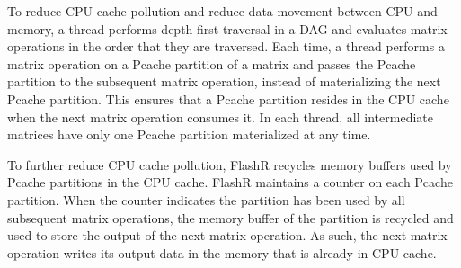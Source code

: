 To reduce CPU cache pollution and reduce data movement between CPU and memory,
a thread performs depth-first traversal in a DAG and evaluates matrix operations
in the order that they are traversed. Each time, a thread performs a matrix
operation on a Pcache partition of a matrix and passes the Pcache partition to
the subsequent matrix operation, instead of materializing the next Pcache partition.
This ensures that a Pcache partition resides in the CPU cache when the next
matrix operation consumes it. In each thread, all intermediate matrices have
only one Pcache partition materialized at any time.

To further reduce CPU cache pollution, FlashR recycles memory buffers used
by Pcache partitions in the CPU cache. FlashR maintains a counter on each
Pcache partition. When the counter indicates the partition has been used
by all subsequent matrix operations, the memory buffer of the partition is
recycled and used to store the output of
the next matrix operation. As such, the next matrix operation writes
its output data in the memory that is already in CPU cache.
